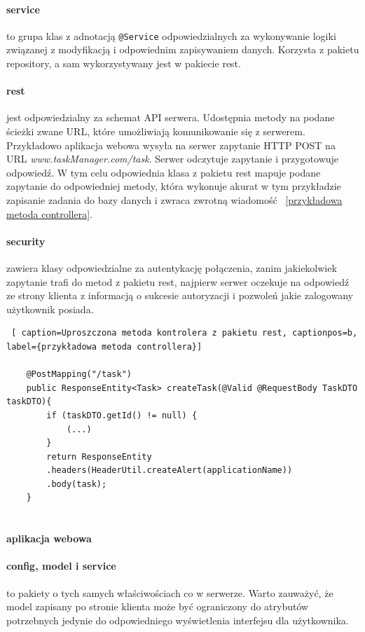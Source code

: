 \paragraph{service}  to grupa klas z adnotacją  \texttt{@Service} odpowiedzialnych za wykonywanie logiki związanej z modyfikacją i odpowiednim zapisywaniem danych. Korzysta z pakietu repository, a sam wykorzystywany jest w pakiecie rest.
\paragraph{rest}  jest odpowiedzialny za schemat API serwera. Udostępnia  metody na podane ścieżki zwane URL, które umożliwiają komunikowanie się z serwerem. Przykładowo aplikacja webowa wysyła na serwer zapytanie HTTP POST na URL
\textit{www.taskManager.com/task}. Serwer odczytuje zapytanie i przygotowuje odpowiedź. W tym celu odpowiednia klasa z pakietu rest mapuje podane zapytanie do odpowiedniej metody, która wykonuje akurat w tym przykładzie zapisanie zadania do bazy danych i zwraca zwrotną wiadomość ~\ref{przykładowa metoda controllera}.

\paragraph{security} zawiera klasy odpowiedzialne za autentykację połączenia, zanim jakiekolwiek zapytanie trafi do metod z pakietu rest, najpierw serwer oczekuje na odpowiedź ze strony klienta z informacją o sukcesie autoryzacji i pozwoleń jakie zalogowany użytkownik posiada.

\begin{lstlisting} [ caption=Uproszczona metoda kontrolera z pakietu rest, captionpos=b, label={przykładowa metoda controllera}]
	
	@PostMapping("/task")
	public ResponseEntity<Task> createTask(@Valid @RequestBody TaskDTO taskDTO){
		if (taskDTO.getId() != null) {
			(...)
		}
		return ResponseEntity
		.headers(HeaderUtil.createAlert(applicationName))
		.body(task);
	}
	
\end{lstlisting}

\paragraph{aplikacja webowa}
\paragraph{config, model i service} to pakiety o tych samych właściwościach co w serwerze. Warto zauważyć, że model zapisany po stronie klienta może być ograniczony do atrybutów potrzebnych jedynie do odpowiedniego wyświetlenia interfejsu dla użytkownika. 
